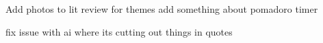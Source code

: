 Add photos to lit review for themes
add something about pomadoro timer

fix issue with ai where its cutting out things in quotes